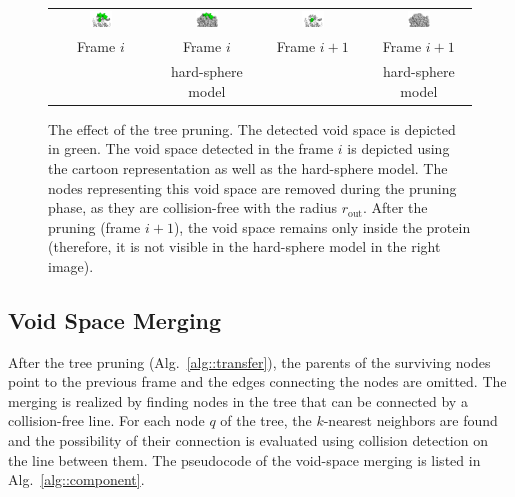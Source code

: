 \documentclass[usletter, 10pt, conference]{svjour3}      %
\def\gprobe{r_{\mathrm{out}}}
\begin{document}
\begin{figure}
\centering
{
\renewcommand{\tabcolsep}{1pt}
\begin{tabular}{cccc}
\includegraphics[width=0.24\textwidth]{fig/688a} &
\includegraphics[width=0.24\textwidth]{fig/688b} & 
\includegraphics[width=0.24\textwidth]{fig/688d} &
\includegraphics[width=0.24\textwidth]{fig/688c} \\
Frame $i$ & Frame $i$ &  Frame $i+1$ & Frame $i+1$ \\
          & hard-sphere model & & hard-sphere model
\end{tabular}
}
\caption{\label{fig::tp2}
The effect of the tree pruning.
The detected void space is depicted in green.
The void space detected in the frame $i$ is depicted using the cartoon representation as well as the hard-sphere model.
The nodes representing this void space are removed during the pruning phase, as they are collision-free with the radius $\gprobe$.
After the pruning (frame $i+1$), the void space remains only inside the protein (therefore, it is not visible in the hard-sphere
model in the right image).
}
\end{figure}

\subsection{Void Space Merging}

After the tree pruning (Alg.~\ref{alg::transfer}), the parents of the surviving nodes point to the previous frame and the edges connecting the nodes are omitted.
The merging is realized by finding nodes in the tree that can be connected by a collision-free line.
For each node $q$ of the tree, the $k$-nearest neighbors are found and the possibility of their connection is evaluated using collision detection on the line between them.
The pseudocode of the void-space merging is listed in Alg.~\ref{alg::component}.
\end{document}
